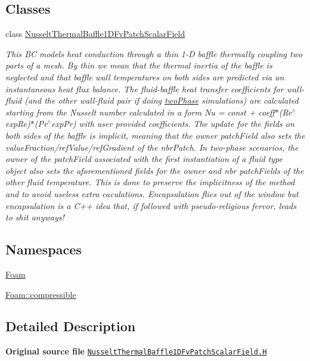 \subsection*{Classes}
\begin{DoxyCompactItemize}
\item 
class \hyperlink{classFoam_1_1compressible_1_1NusseltThermalBaffle1DFvPatchScalarField}{Nusselt\+Thermal\+Baffle1\+D\+Fv\+Patch\+Scalar\+Field}
\begin{DoxyCompactList}\small\item\em This BC models heat conduction through a thin 1-\/D baffle thermally coupling two parts of a mesh. By \textquotesingle{}thin\textquotesingle{} we mean that the thermal inertia of the baffle is neglected and that baffle wall temperatures on both sides are predicted via an instantaneous heat flux balance. The fluid-\/baffle heat transfer coefficients for wall-\/fluid (and the other wall-\/fluid pair if doing \hyperlink{classFoam_1_1twoPhase}{two\+Phase} simulations) are calculated starting from the Nusselt number calculated in a form Nu = const + coeff$\ast$(Re$^\wedge$exp\+Re)$\ast$(Pr$^\wedge$exp\+Pr) with user provided coefficients. The update for the fields on both sides of the baffle is implicit, meaning that the owner patch\+Field also sets the value\+Fraction/ref\+Value/ref\+Gradient of the nbr\+Patch. In two-\/phase scenarios, the owner of the patch\+Field associated with the first instantiation of a fluid type object also sets the aforementioned fields for the owner and nbr patch\+Fields of the other fluid temperature. This is done to preserve the implicitness of the method and to avoid useless extra caculations. Encapsulation flies out of the window but encapsulation is a C++ idea that, if followed with pseudo-\/religious fervor, leads to shit anyways! \end{DoxyCompactList}\end{DoxyCompactItemize}
\subsection*{Namespaces}
\begin{DoxyCompactItemize}
\item 
 \hyperlink{namespaceFoam}{Foam}
\item 
 \hyperlink{namespaceFoam_1_1compressible}{Foam\+::compressible}
\end{DoxyCompactItemize}


\subsection{Detailed Description}
{\bfseries Original source file} \href{../../../home/carlo/data/GeN-Foam/GeN-Foam_ffn/GeN-Foam/GeN-Foam/classes/thermalHydraulics/src/boundaryConditions/NusseltThermalBaffle1D/NusseltThermalBaffle1DFvPatchScalarField.H}{\tt Nusselt\+Thermal\+Baffle1\+D\+Fv\+Patch\+Scalar\+Field.\+H} 